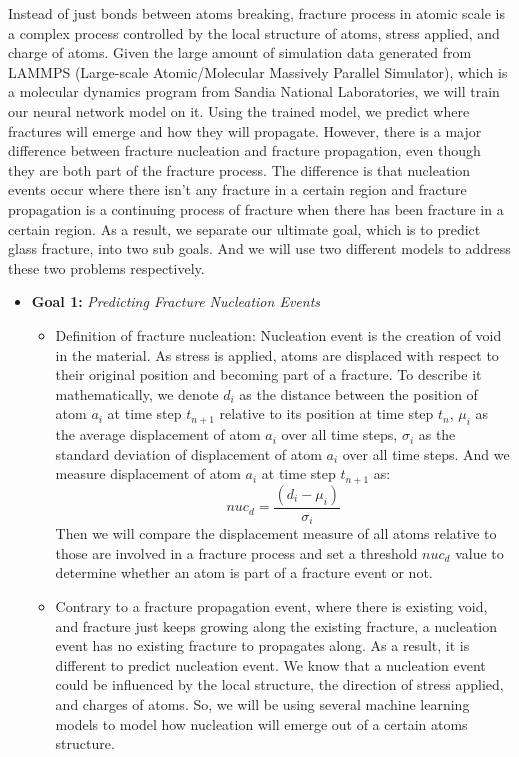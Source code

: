 
Instead of just bonds between atoms breaking, fracture process in atomic scale is a complex process controlled by the local structure of atoms, stress applied, and charge of atoms. 
Given the large amount of simulation data generated from LAMMPS (Large-scale Atomic/Molecular Massively Parallel Simulator), which is a molecular dynamics program from Sandia National Laboratories, we will train our neural network model on it. Using the trained model, we predict where fractures will emerge and how they will propagate. However, there is a major difference between fracture nucleation and fracture propagation, even though they are both part of the fracture process. The difference is that nucleation events occur where there isn't any fracture in a certain region and fracture propagation is a continuing process of fracture when there has been fracture in a certain region. As a result, we separate our ultimate goal, which is to predict glass fracture, into two sub goals. And we will use two different models to address these two problems respectively. 


\begin{itemize}
\item \textbf{Goal 1:} \emph{Predicting Fracture Nucleation Events} 
\begin{itemize} 
    \item Definition of fracture nucleation: Nucleation event is the creation of void in the material. As stress is applied, atoms are displaced with respect to their original position and becoming part of a fracture. To describe it mathematically, we denote $d_i$ as the distance between the position of atom $a_i$ at time step $t_{n+1}$ relative to its position at time step $t_{n}$, $\mu_i$ as the average displacement of atom $a_i$ over all time steps, $\sigma_i$ as the standard deviation of displacement of atom $a_i$ over all time steps. And we measure displacement of atom $a_i$ at time step $t_{n+1}$ as:
    \[
    nuc_d = \frac{(d_i - \mu_i)}{\sigma_i}
    \]
    Then we will compare the displacement measure of all atoms relative to those are involved in a fracture process and set a threshold $nuc_d$ value to determine whether an atom is part of a fracture event or not.
    \item Contrary to a fracture propagation event, where there is existing void, and fracture just keeps growing along the existing fracture, a nucleation event has no existing fracture to propagates along. As a result, it is different to predict nucleation event. We know that a nucleation event could be influenced by the local structure, the direction of stress applied, and charges of atoms. So, we will be using several machine learning models to model how nucleation will emerge out of a certain atoms structure. 
\end{itemize}
\end{itemize}


